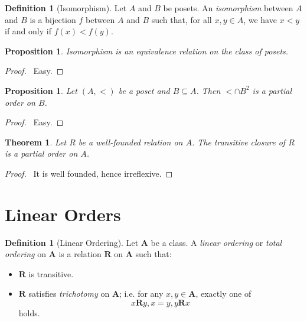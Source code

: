 \documentclass{article}
\let\qed\relax
\newtheorem{proposition}[axiom]{Proposition}
\newtheorem{theorem}[axiom]{Theorem}
\theoremstyle{definition}
\newtheorem{definition}[axiom]{Definition}
\begin{document}
    \begin{definition}[Isomorphism]
        Let $A$ and $B$ be posets. An \emph{isomorphism} between $A$ and $B$ is a bijection $f$ between $A$
        and $B$ such that, for all $x, y \in A$, we have $x < y$ if and only if $f(x) < f(y)$.
    \end{definition}

    \begin{proposition}
        Isomorphism is an equivalence relation on the class of posets.
    \end{proposition}

    \begin{proof}
        \pf\ Easy. \qed
    \end{proof}

    \begin{proposition}
        Let $(A, <)$ be a poset and $B \subseteq A$. Then $< \cap B^2$ is a partial order on $B$.
    \end{proposition}

    \begin{proof}
        \pf\ Easy. \qed
    \end{proof}

    \begin{theorem}
        Let $R$ be a well-founded relation on $A$. The transitive closure of $R$ is a partial order on $A$.
    \end{theorem}

    \begin{proof}
        \pf\ It is well founded, hence irreflexive. \qed
    \end{proof}

    \section{Linear Orders}

    \begin{definition}[Linear Ordering]
        Let $\mathbf{A}$ be a class. A \emph{linear ordering} or \emph{total ordering} on $\mathbf{A}$
        is a relation $\mathbf{R}$ on $\mathbf{A}$ such that:
        \begin{itemize}
            \item $\mathbf{R}$ is transitive.
            \item $\mathbf{R}$ satisfies \emph{trichotomy} on $\mathbf{A}$; i.e. for any $x, y \in \mathbf{A}$,
            exactly one of
            \[ x\mathbf{R}y, x=y, y\mathbf{R}x \]
            holds.
        \end{itemize}
    \end{definition}
\end{document}
